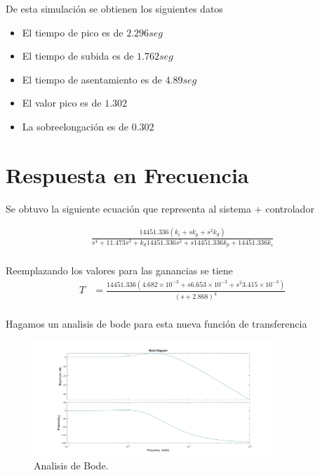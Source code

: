 \documentclass[a4paper]{IEEEtran} %
\begin{document}
De esta simulación se obtienen los siguientes datos
\begin{itemize}
    \item El tiempo de pico es de $2.296seg$
    \item El tiempo de subida es de $1.762seg$
    \item El tiempo de asentamiento es de $4.89seg$
    \item El valor pico es de $1.302$
    \item La sobreelongación es de $0.302$
\end{itemize}   
\section{Respuesta en Frecuencia}
Se obtuvo la siguiente ecuación que representa al sistema + controlador

\begin{equation}
    \begin{split}
        \frac{14451.336(k_{i}+sk_{p}+s^2k_{d})}{s^4+11.473s^3+k_{d}14451.336s^2+s14451.336k_{p}+14451.336k_{i}}\\
    \end{split}
    \label{eq:PD_num}
\end{equation}

Reemplazando los valores para las ganancias se tiene
\begin{equation}
    \begin{split}
        T&=\frac{14451.336(4.682\times 10^{-3}+s6.653\times 10^{-3}+s^2 3.415\times 10^{-3})}{(s+2.868)^4}\\
    \end{split}
    \label{eq:PD_num_reeempla}
\end{equation}

Hagamos un analisis de bode para esta nueva función de transferencia

\begin{figure}[h]
    \centering
        \includegraphics[width=9cm]{images/14}
        \caption{Analisis de Bode.}
        \label{fig:bode}
\end{figure}
\end{document}
